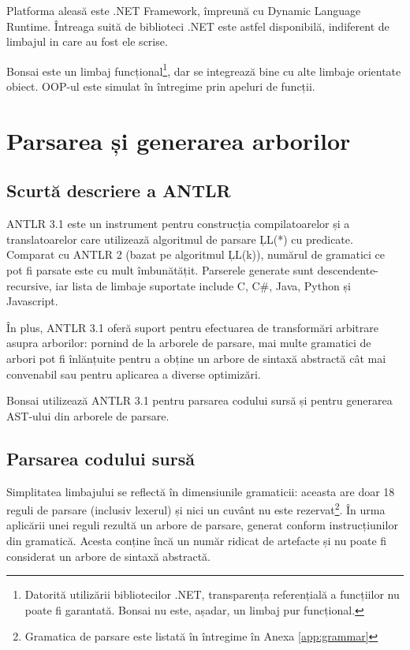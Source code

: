 \documentclass[12pt,a4paper]{memoir}
\begin{document}
Platforma aleasă este .NET Framework, împreună cu Dynamic Language Runtime. Întreaga suită de biblioteci .NET este astfel disponibilă, indiferent de limbajul in care au fost ele scrise. 

Bonsai este un limbaj funcțional\footnote{Datorită utilizării bibliotecilor .NET, transparența referențială a funcțiilor nu poate fi garantată. Bonsai nu este, așadar, un limbaj pur funcțional.}, dar se integrează bine cu alte limbaje orientate obiect. OOP-ul este simulat în întregime prin apeluri de funcții.

\chapter{Parsarea și generarea arborilor}

\section{Scurtă descriere a ANTLR}

ANTLR 3.1\cite{antlr} este un instrument pentru construcția compilatoarelor și a translatoarelor care utilizează algoritmul de parsare \c{LL(*)} cu predicate\cite{definitive_antlr_reference}. Comparat cu ANTLR 2 (bazat pe algoritmul \c{LL(k)}), numărul de gramatici ce pot fi parsate este cu mult îmbunătățit. Parserele generate sunt descendente-recursive, iar lista de limbaje suportate\cite{antlr_targets} include C, C\#, Java, Python și Javascript.

În plus, ANTLR 3.1 oferă suport pentru efectuarea de transformări arbitrare asupra arborilor: pornind de la arborele de parsare, mai multe gramatici de arbori pot fi înlănțuite pentru a obține un arbore de sintaxă abstractă cât mai convenabil sau pentru aplicarea a diverse optimizări\cite{antlr_tree_grammars}.

Bonsai utilizează ANTLR 3.1 pentru parsarea codului sursă și pentru generarea AST-ului din arborele de parsare.

\section{Parsarea codului sursă}

Simplitatea limbajului se reflectă în dimensiunile gramaticii: aceasta are doar 18 reguli de parsare (inclusiv lexerul) și nici un cuvânt nu este rezervat\footnote{Gramatica de parsare este listată în întregime în Anexa \ref{app:grammar}}. În urma aplicării unei reguli rezultă un arbore de parsare, generat conform instrucțiunilor din gramatică. Acesta conține încă un număr ridicat de artefacte și nu poate fi considerat un arbore de sintaxă abstractă.
\end{document}
